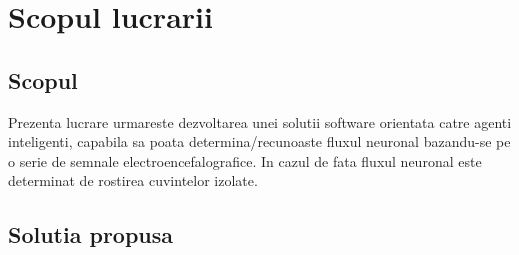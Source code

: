 \section{Scopul lucrarii}

\subsection{Scopul}

\quad Prezenta lucrare urmareste dezvoltarea unei solutii software
orientata catre agenti inteligenti, capabila sa poata
determina/recunoaste fluxul neuronal bazandu-se pe o serie de 
semnale electroencefalografice. In cazul de fata fluxul neuronal este
determinat de rostirea cuvintelor izolate.

\subsection{Solutia propusa}

